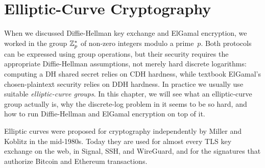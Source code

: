 \chapter{Elliptic-Curve Cryptography}
\label{chap:ecc}

\newcommand{\eccRealCurve}{\draw[thick] plot[smooth] coordinates {(2.050,-2.750) (1.883,-2.408) (1.721,-2.092) (1.563,-1.804) (1.409,-1.545) (1.259,-1.318) (1.114,-1.126) (0.972,-0.973) (0.835,-0.864) (0.702,-0.803) (0.574,-0.784) (0.449,-0.801) (0.329,-0.841) (0.213,-0.893) (0.101,-0.949) (-0.006,-1.003) (-0.110,-1.053) (-0.209,-1.095) (-0.304,-1.130) (-0.395,-1.155) (-0.481,-1.170) (-0.563,-1.177) (-0.641,-1.174) (-0.715,-1.162) (-0.785,-1.141) (-0.850,-1.112) (-0.911,-1.074) (-0.968,-1.030) (-1.021,-0.978) (-1.070,-0.920) (-1.114,-0.856) (-1.154,-0.786) (-1.190,-0.711) (-1.221,-0.632) (-1.249,-0.549) (-1.272,-0.463) (-1.291,-0.373) (-1.306,-0.282) (-1.316,-0.189) (-1.323,-0.095) (-1.325,-0.000) (-1.323,0.095) (-1.316,0.189) (-1.306,0.282) (-1.291,0.373) (-1.272,0.463) (-1.249,0.549) (-1.221,0.632) (-1.190,0.711) (-1.154,0.786) (-1.114,0.856) (-1.070,0.920) (-1.021,0.978) (-0.968,1.030) (-0.911,1.074) (-0.850,1.112) (-0.785,1.141) (-0.715,1.162) (-0.641,1.174) (-0.563,1.177) (-0.481,1.170) (-0.395,1.155) (-0.304,1.130) (-0.209,1.095) (-0.110,1.053) (-0.006,1.003) (0.101,0.949) (0.213,0.893) (0.329,0.841) (0.449,0.801) (0.574,0.784) (0.702,0.803) (0.835,0.864) (0.972,0.973) (1.114,1.126) (1.259,1.318) (1.409,1.545) (1.563,1.804) (1.721,2.092) (1.883,2.408) (2.050,2.750)};}

When we discussed Diffie-Hellman key exchange and ElGamal encryption,
we worked in the group $\mathbb{Z}^*_p$ of non-zero integers modulo a prime~$p$.
Both protocols can be expressed using group operations, but their security
requires the appropriate Diffie-Hellman assumptions, not merely hard discrete
logarithms: computing a DH shared secret relies on CDH hardness, while
textbook ElGamal's chosen-plaintext security relies on DDH hardness.
In practice we usually use suitable \emph{elliptic-curve groups}.
In this chapter, we will see what an elliptic-curve group actually is,
why the discrete-log problem in it seems to be so hard,
and how to run Diffie-Hellman and ElGamal encryption on top of it.

Elliptic curves were proposed for cryptography independently by
Miller\autocite{Miller85} and Koblitz\autocite{Koblitz87} in the mid-1980s.
Today they are used for almost every TLS key exchange on the web,
in Signal, SSH, and WireGuard, and for the signatures that authorize
Bitcoin and Ethereum transactions.

